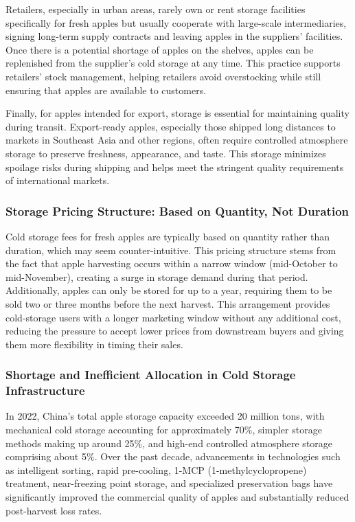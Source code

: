 Retailers, especially in urban areas, rarely own or rent storage facilities specifically for fresh apples but usually cooperate with large-scale intermediaries, signing long-term supply contracts and leaving apples in the suppliers' facilities. Once there is a potential shortage of apples on the shelves, apples can be replenished from the supplier's cold storage at any time. This practice supports retailers' stock management, helping retailers avoid overstocking while still ensuring that apples are available to customers.

Finally, for apples intended for export, storage is essential for maintaining quality during transit. Export-ready apples, especially those shipped long distances to markets in Southeast Asia and other regions, often require controlled atmosphere storage to preserve freshness, appearance, and taste. This storage minimizes spoilage risks during shipping and helps meet the stringent quality requirements of international markets.




\subsubsection{Storage Pricing Structure: Based on Quantity, Not Duration} 
Cold storage fees for fresh apples are typically based on quantity rather than duration, which may seem counter-intuitive. This pricing structure stems from the fact that apple harvesting occurs within a narrow window (mid-October to mid-November), creating a surge in storage demand during that period. Additionally, apples can only be stored for up to a year, requiring them to be sold two or three months before the next harvest. This arrangement provides cold-storage users with a longer marketing window without any additional cost, reducing the pressure to accept lower prices from downstream buyers and giving them more flexibility in timing their sales.

\subsubsection{Shortage and Inefficient Allocation in Cold Storage Infrastructure} 
In 2022, China’s total apple storage capacity exceeded 20 million tons, with mechanical cold storage accounting for approximately 70\%, simpler storage methods making up around 25\%, and high-end controlled atmosphere storage comprising about 5\%. Over the past decade, advancements in technologies such as intelligent sorting, rapid pre-cooling, 1-MCP (1-methylcyclopropene) treatment, near-freezing point storage, and specialized preservation bags have significantly improved the commercial quality of apples and substantially reduced post-harvest loss rates.

